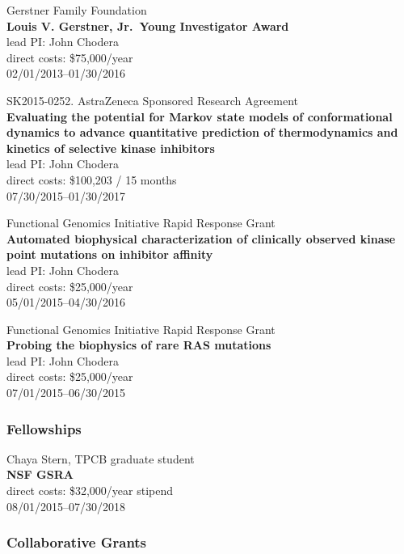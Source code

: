 \documentclass[10pt]{article}
\begin{document}
Gerstner Family Foundation\\
{\bf Louis V. Gerstner, Jr.~Young Investigator Award}\\
lead PI: John Chodera\\
direct costs: \$75,000/year\\
02/01/2013--01/30/2016

\vspace{2ex}

SK2015-0252. AstraZeneca Sponsored Research Agreement\\
{\bf Evaluating the potential for Markov state models of conformational dynamics to advance quantitative prediction of thermodynamics and kinetics of selective kinase inhibitors}\\
lead PI: John Chodera\\
direct costs: \$100,203 / 15 months\\
07/30/2015--01/30/2017

\vspace{2ex}

Functional Genomics Initiative Rapid Response Grant\\
{\bf Automated biophysical characterization of clinically observed kinase point mutations on inhibitor affinity}\\
lead PI: John Chodera\\
direct costs: \$25,000/year\\
05/01/2015--04/30/2016

\vspace{2ex}

Functional Genomics Initiative Rapid Response Grant\\
{\bf Probing the biophysics of rare RAS mutations}\\
lead PI: John Chodera\\
direct costs: \$25,000/year\\
07/01/2015--06/30/2015

\subsubsection*{Fellowships}

Chaya Stern, TPCB graduate student\\
{\bf NSF GSRA}\\
direct costs: \$32,000/year stipend\\
08/01/2015--07/30/2018

\subsubsection*{Collaborative Grants}
\end{document}
